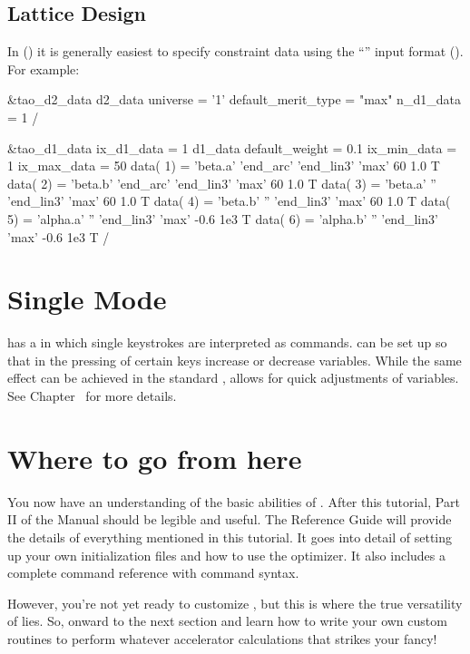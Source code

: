 \subsection{Lattice Design}
\label{ss:lattice_design}

In  () it is generally
easiest to specify constraint data using the ``''
input format (). For example:
\begin{example}
&tao_d2_data
  d2_data%
  universe = '1'
  default_merit_type = "max"
  n_d1_data = 1
/

&tao_d1_data
  ix_d1_data = 1
  d1_data%
  default_weight = 0.1
  ix_min_data = 1
  ix_max_data = 50
  data( 1) = 'beta.a'  'end_arc' 'end_lin3' 'max'    60   1.0   T
  data( 2) = 'beta.b'  'end_arc' 'end_lin3' 'max'    60   1.0   T
  data( 3) = 'beta.a'  ''        'end_lin3' 'max'    60   1.0   T
  data( 4) = 'beta.b'  ''        'end_lin3' 'max'    60   1.0   T
  data( 5) = 'alpha.a' ''        'end_lin3' 'max'   -0.6  1e3   T 
  data( 6) = 'alpha.b' ''        'end_lin3' 'max'   -0.6  1e3   T 
/
\end{example}


\section{Single Mode}
\label{s:single.mode}

\tao has a  in which single keystrokes are interpreted
as commands. \tao can be set up so that in  the
pressing of certain keys increase or decrease variables. While the
same effect can be achieved in the standard ,  allows for quick adjustments of variables. See
Chapter~ for more details.

\section{Where to go from here}
\label{s:where.to.go}

You now have an understanding of the basic abilities of \tao. After
this tutorial, Part II of the \tao Manual should be legible and
useful.  The Reference Guide will provide the details of everything
mentioned in this tutorial.  It goes into detail of setting up your
own initialization files and how to use the optimizer. It also
includes a complete command reference with command syntax.

However, you're not yet ready to customize \tao, but this is where the
true versatility of \tao lies. So, onward to the next section and
learn how to write your own custom routines to perform whatever
accelerator calculations that strikes your fancy!
